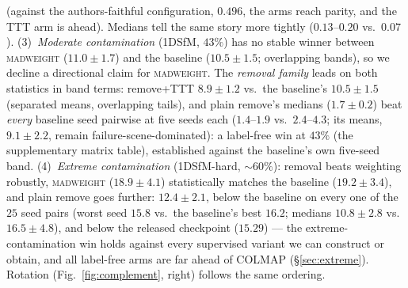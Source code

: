 \documentclass[10pt,twocolumn,letterpaper]{article}
\newcommand{\mad}{\textsc{madweight}}
\begin{document}
(against the authors-faithful configuration, $0.496$, the arms reach parity, and the TTT
arm is ahead). Medians tell the same story more tightly ($0.13$--$0.20$ vs.\ $0.07$).
(3)~\emph{Moderate contamination} (1DSfM, $43\%$) has no stable winner between \mad{}
($11.0\pm1.7$) and the baseline ($10.5\pm1.5$; overlapping bands), so we decline a
directional claim for \mad{}. The \emph{removal family} leads on both statistics in
band terms: remove+TTT $8.9\pm1.2$ vs.\ the baseline's $10.5\pm1.5$ (separated means,
overlapping tails), and plain remove's medians ($1.7\pm0.2$) beat \emph{every} baseline
seed pairwise at five seeds each ($1.4$--$1.9$ vs.\ $2.4$--$4.3$; its means, $9.1\pm2.2$,
remain failure-scene-dominated): a label-free win at $43\%$ (the supplementary matrix table),
established against the baseline's own five-seed band.
(4)~\emph{Extreme contamination} (1DSfM-hard, ${\sim}60\%$): removal beats
weighting robustly, \mad{} ($18.9\pm4.1$) statistically matches the baseline
($19.2\pm3.4$), and plain remove goes further: $12.4\pm2.1$, below the baseline on
every one of the $25$ seed pairs (worst seed $15.8$ vs.\ the baseline's best $16.2$;
medians $10.8\pm2.8$ vs.\ $16.5\pm4.8$), and below the released checkpoint ($15.29$)
--- the extreme-contamination win holds against every supervised variant we can
construct or obtain, and all label-free arms are far ahead of COLMAP
(\S\ref{sec:extreme}). Rotation (Fig.~\ref{fig:complement}, right) follows the same
ordering. 
\end{document}
